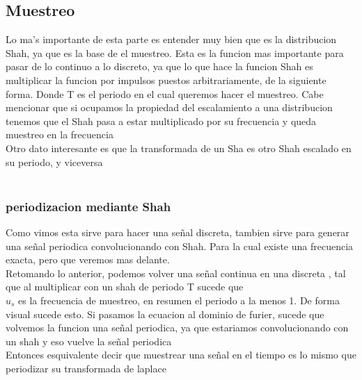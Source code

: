 \subsection{Muestreo}
Lo ma's importante de esta parte es entender muy bien que es la distribucion Shah, ya que es la base de el muestreo. Esta es la funcion mas importante para pasar de lo continuo a lo discreto, ya que lo que hace la funcion Shah es multiplicar la funcion por impulsos puestos arbitrariamente, de la siguiente forma.
Donde T es el periodo en el cual queremos hacer el muestreo. Cabe mencionar que si ocupamos la propiedad del escalamiento a una distribucion tenemos que el Shah pasa a estar multiplicado por su frecuencia y queda muestreo en la frecuencia\\
Otro dato interesante es que la transformada de un Sha es otro Shah escalado en su periodo, y viceversa\\\\
\subsubsection{periodizacion mediante Shah}
Como vimos esta sirve para hacer una señal discreta, tambien  sirve para generar una señal periodica convolucionando con Shah. Para la cual existe una frecuencia exacta, pero que veremos mas delante.\\
Retomando lo anterior, podemos volver una señal continua en una discreta , tal que al multiplicar con un shah de periodo T sucede que
\\
$u_s$ es la frecuencia de muestreo, en resumen el periodo a la menos 1. De forma visual sucede esto.
Si pasamos la ecuacion al dominio de furier, sucede que volvemos la funcion una señal periodica, ya que estariamos convolucionando con un shah  y eso vuelve la señal periodica\\
Entonces esquivalente decir que muestrear una señal en el tiempo es lo mismo que periodizar su transformada de laplace  \\\\\\\\
